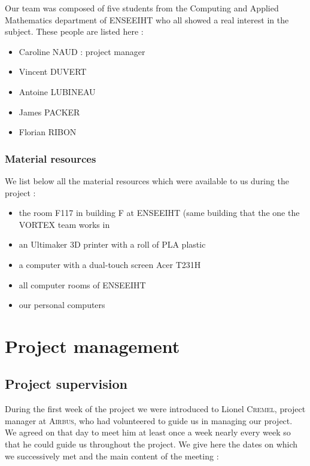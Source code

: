 \documentclass{report}
\begin{document}
	Our team was composed of five students from the Computing and Applied Mathematics department of ENSEEIHT who all showed a real interest in the subject. These people are listed here :

\begin{itemize}
\item Caroline \textsc{NAUD} : project manager
\item Vincent \textsc{DUVERT}
\item Antoine \textsc{LUBINEAU}
\item James \textsc{PACKER}
\item Florian \textsc{RIBON}
\end{itemize}

\subsection{Material resources}

	We list below all the material resources which were available to us during the project :

\begin{itemize}
\item the room F117 in building F at ENSEEIHT (same building that the one the \textsc{VORTEX} team works in
\item an Ultimaker 3D printer with a roll of PLA plastic
\item a computer with a dual-touch screen Acer T231H
\item all computer rooms of ENSEEIHT
\item our personal computers
\end{itemize}

\chapter{Project management}

\section{Project supervision}

	During the first week of the project we were introduced to Lionel \textsc{Cremel}, project manager at \textsc{Airbus}, who had volunteered to guide us in managing our project. We agreed on that day to meet him at least once a week nearly every week so that he could guide us throughout the project. We give here the dates on which we successively met and the main content of the meeting :
	
\end{document}
